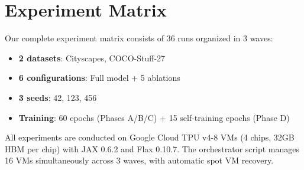 \documentclass{article}
\begin{document}
\section{Experiment Matrix}
\label{sec:appendix_experiment}

Our complete experiment matrix consists of 36 runs organized in 3 waves:
\begin{itemize}
    \item \textbf{2 datasets}: Cityscapes, COCO-Stuff-27
    \item \textbf{6 configurations}: Full model + 5 ablations
    \item \textbf{3 seeds}: 42, 123, 456
    \item \textbf{Training}: 60 epochs (Phases A/B/C) + 15 self-training epochs (Phase D)
\end{itemize}

All experiments are conducted on Google Cloud TPU v4-8 VMs (4 chips, 32GB HBM per chip) with JAX 0.6.2 and Flax 0.10.7. The orchestrator script manages 16 VMs simultaneously across 3 waves, with automatic spot VM recovery.
\end{document}
